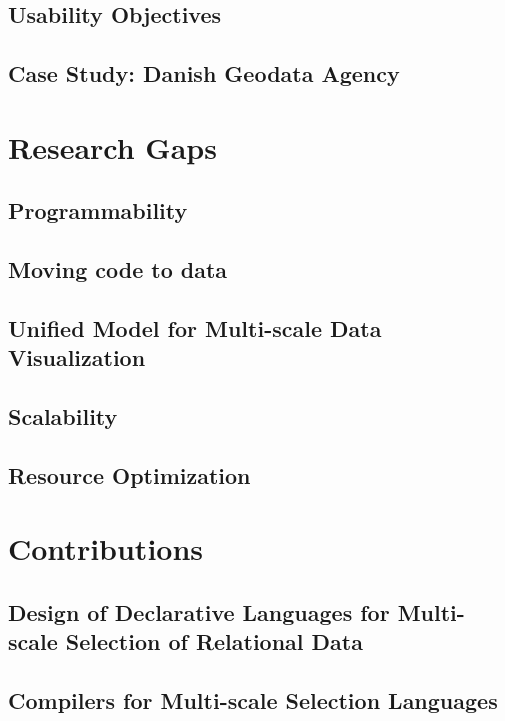 \documentclass[11pt, oneside]{report}   	%
\begin{document}
\subsection{Usability Objectives}
\subsection{Case Study: Danish Geodata Agency}

\section{Research Gaps}
\subsection{Programmability}
\subsection{Moving code to data}
\subsection{Unified Model for Multi-scale Data Visualization}
\subsection{Scalability}
\subsection{Resource Optimization}


\section{Contributions}
\subsection{Design of Declarative Languages for Multi-scale Selection of Relational Data}
\subsection{Compilers for Multi-scale Selection Languages}
\end{document}

